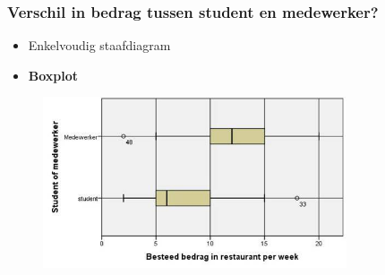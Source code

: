 \documentclass{beamer}
\begin{document}
  \begin{frame}
    \frametitle{Verschil in bedrag tussen student en medewerker?}
    \begin{itemize}
      \item Enkelvoudig staafdiagram
      \item  \textbf{Boxplot}
    \end{itemize}
    \begin{figure}
      \centering
      \includegraphics[width=0.8\textwidth]{img/studentenboxplot.jpg}
      \label{fig:studentenbox}
    \end{figure}

  \end{frame}
\end{document}

